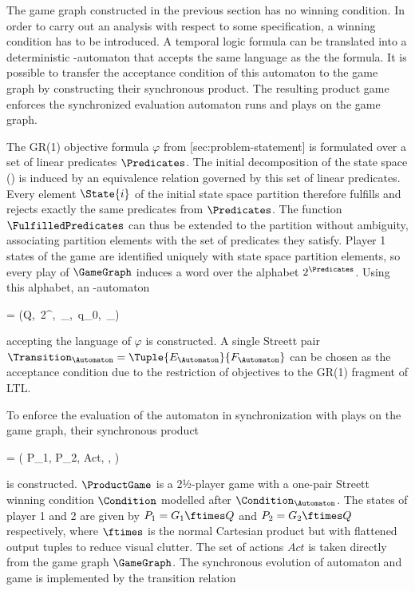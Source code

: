 The game graph constructed in the previous section has no winning condition.
In order to carry out an analysis with respect to some specification, a winning condition has to be introduced.
A temporal logic formula can be translated into a deterministic \omega-automaton that accepts the same language as the the formula.
It is possible to transfer the acceptance condition of this automaton to the game graph by constructing their synchronous product.
The resulting product game enforces the synchronized evaluation automaton runs and plays on the game graph.


\startsubsection[title={Objective Automaton},reference=sec:abstraction-product-automaton]

    The GR(1) objective formula $\varphi$ from [sec:problem-statement] is formulated over a set of linear predicates $\Predicates$.
    The initial decomposition of the state space () is induced by an equivalence relation governed by this set of linear predicates.
    Every element $\State{i}$ of the initial state space partition therefore fulfills and rejects exactly the same predicates from $\Predicates$.
    The function $\FulfilledPredicates$ can thus be extended to the partition without ambiguity, associating partition elements with the set of predicates they satisfy.
    Player 1 states of the game are identified uniquely with state space partition elements, so every play of $\GameGraph$ induces a word over the alphabet $2^\Predicates$.
    Using this alphabet, an \omega-automaton

    \startformula
        \Automaton = (Q,\, 2^\Predicates,\, \Transition_\Automaton,\, q_0,\, \Condition_\Automaton)
    \stopformula

    accepting the language of $\varphi$ is constructed.
    A single Streett pair $\Transition_\Automaton = \Tuple{E_\Automaton}{F_\Automaton}$ can be chosen as the acceptance condition due to the restriction of objectives to the GR(1) fragment of LTL.

\stopsubsection


\startsubsection[title={Synchronized Product},reference=sec:abstraction-product-product]

    To enforce the evaluation of the automaton in synchronization with plays on the game graph, their synchronous product

    \startformula
        \ProductGame = ( P_1, P_2, Act, \Transition, \Condition )
    \stopformula

    is constructed.
    $\ProductGame$ is a 2½-player game with a one-pair Streett winning condition $\Condition$ modelled after $\Condition_\Automaton$.
    The states of player 1 and 2 are given by $P_1 = G_1 \ftimes Q$ and $P_2 = G_2 \ftimes Q$ respectively, where $\ftimes$ is the normal Cartesian product but with flattened output tuples to reduce visual clutter.
    The set of actions $Act$ is taken directly from the game graph $\GameGraph$.
    The synchronous evolution of automaton and game is implemented by the transition relation

